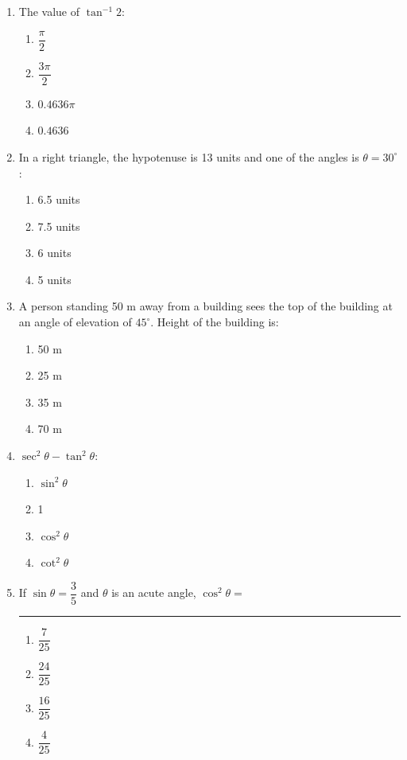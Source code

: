 \documentclass[11pt]{article}
\begin{document}
\begin{enumerate}[label=\textbf{\arabic*.}, start=204, leftmargin=2em]
\item The value of $\tan^{-1} 2$:
\begin{enumerate}[label=(\Alph*)] \item $\dfrac{\pi}{2}$ \item $\dfrac{3\pi}{2}$ \item $0.4636\pi$ \item $0.4636$ \end{enumerate}

\item In a right triangle, the hypotenuse is 13 units and one of the angles is $\theta = 30^\circ$:
\begin{enumerate}[label=(\Alph*)] \item 6.5 units \item 7.5 units \item 6 units \item 5 units \end{enumerate}

\item A person standing 50 m away from a building sees the top of the building at an angle of elevation of $45^\circ$. Height of the building is:
\begin{enumerate}[label=(\Alph*)] \item 50 m \item 25 m \item 35 m \item 70 m \end{enumerate}

\item $\sec^2\theta - \tan^2\theta$:
\begin{enumerate}[label=(\Alph*)] \item $\sin^2\theta$ \item 1 \item $\cos^2\theta$ \item $\cot^2\theta$ \end{enumerate}

\item If $\sin\theta = \dfrac{3}{5}$ and $\theta$ is an acute angle, $\cos^2\theta = $ \rule{1cm}{0.4pt}
\begin{enumerate}[label=(\Alph*)] \item $\dfrac{7}{25}$ \item $\dfrac{24}{25}$ \item $\dfrac{16}{25}$ \item $\dfrac{4}{25}$ \end{enumerate}


\end{enumerate}
\end{document}
